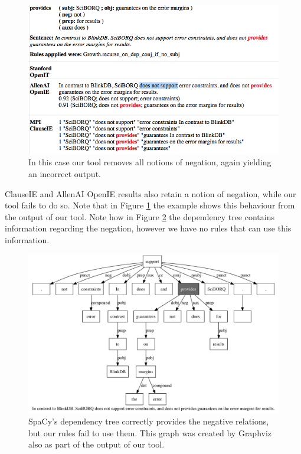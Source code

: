 \documentclass[11pt,a4paper,openright]{memoir}
\begin{document}
\begin{figure}[!htbp]
  \centering
    \includegraphics[width=1.0\textwidth]{./images/our-vs-clauseie-3}
  \caption[In this case our tool removes all notions of negation, again yielding an incorrect output.]{In this case our tool removes all notions of negation, again yielding an incorrect output.}
  \label{fig:our_tool_comparison3}
\end{figure}

ClauseIE and AllenAI OpenIE results also retain a notion of negation, while our tool fails to do so. Note that in Figure \ref{fig:our_tool_comparison3} the example shows this behaviour from the output of our tool. Note how in Figure \ref{fig:our_tool_output_sentence2} the dependency tree contains information regarding the negation, however we have no rules that can use this information.

\begin{figure}[!htbp]
  \centering
    \includegraphics[width=1.0\textwidth]{./images/sentence-4310-6}
  \caption[SpaCy's dependency tree with negation.]{SpaCy's dependency tree correctly provides the negative relations, but our rules fail to use them. This graph was created by Graphviz also as part of the output of our tool.}
  \label{fig:our_tool_output_sentence2}
\end{figure}
\end{document}
